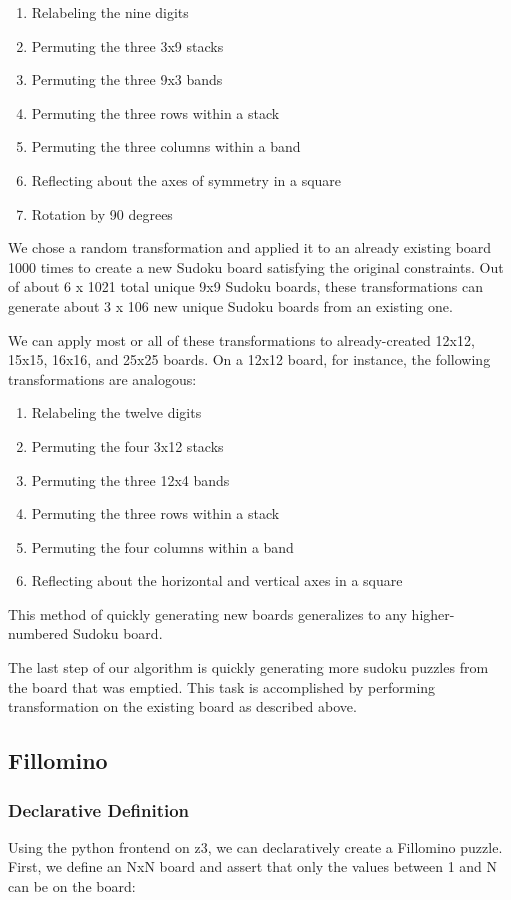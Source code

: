 \begin{enumerate}
\item Relabeling the nine digits
\item Permuting the three 3x9 stacks
\item Permuting the three 9x3 bands
\item Permuting the three rows within a stack
\item Permuting the three columns within a band
\item Reflecting about the axes of symmetry in a square
\item Rotation by 90 degrees
\end{enumerate}
 
We chose a random transformation and applied it to an already existing
board 1000 times to create a new Sudoku board satisfying the original
constraints. Out of about 6 x 1021 total unique 9x9 Sudoku boards,
these transformations can generate about 3 x 106 new unique Sudoku
boards from an existing one.

 
We can apply most or all of these transformations to already-created
12x12, 15x15, 16x16, and 25x25 boards. On a 12x12 board, for instance,
the following transformations are analogous:


\begin{enumerate}
\item Relabeling the twelve digits
\item Permuting the four 3x12 stacks
\item Permuting the three 12x4 bands
\item Permuting the three rows within a stack
\item Permuting the four columns within a band
\item Reflecting about the horizontal and vertical axes in a square
\end{enumerate}
 
This method of quickly generating new boards generalizes to any
higher-numbered Sudoku board. 


The last step of our algorithm is quickly generating more sudoku
puzzles from the board that was emptied. This task is accomplished by
performing transformation on the existing board as described above.


\subsection{Fillomino}

\subsubsection{Declarative Definition}
Using the python frontend on z3, we can declaratively create a Fillomino puzzle.
First, we define an NxN board and assert that only the values between
1 and N can be on the board: 

